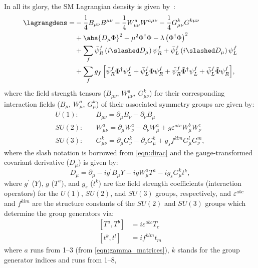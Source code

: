 In all its glory, the SM Lagrangian density is given by~\cite{Halzen:1984mc, thesis_xunwu}:
\begin{align*}
    \lagrangdens =
    & - \frac{1}{4} B_{\mu \nu} B^{\mu \nu} - \frac{1}{4} W^a_{\mu \nu} W^{a \mu \nu} - \frac{1}{4} G^k_{\mu \nu} G^{k \mu \nu}
    \\
    & + \abs{D_\mu\Phi}^2 + \mu^2 \Phi^\dagger \Phi - \lambda \left( \Phi^\dagger \Phi \right)^2
    \\
    & + \sum_f{
            \bar{\psi}^f_R \left(i {\slashed D_\mu}\right) \psi_R^f + \bar{\psi}^f_L \left(i {\slashed D_\mu}\right) \psi_L^f
        }
    \\
    & + \sum_f{
            g_f \left[ \bar{\psi}_R^f \Phi^\dagger \psi_L^f + \bar{\psi}_L^f \Phi \psi_R^f + \bar{\psi}_R^f \tilde{\Phi}^\dagger \psi_L^f + \bar{\psi}_L^f \tilde{\Phi} \psi_R^f \right]
        },
\end{align*}
where the field strength tensors ($B_{\mu \nu}$, $W_{\mu \nu}^a$, $G_{\mu \nu}^k$) for their corresponding interaction fields
($B_\mu$, $W_\mu^a$, $G_\mu^k$)
of their associated symmetry groups are given by:
\begin{align*}
    U(1) : \quad & B_{\mu \nu}    = \partial_\mu B_\nu - \partial_\nu B_\mu
    \\
    SU(2) : \quad & W_{\mu \nu}^a  = \partial_\mu W_\nu^a - \partial_\nu W_\mu^a + g \varepsilon^{abc} W_\mu^b W_\nu^c
    \\
    SU(3) : \quad & G_{\mu \nu}^k  = \partial_\mu G_\nu^k - \partial_\nu G_\mu^k + g_s f^{klm} G_\mu^l G_\nu^m,
\end{align*}
where the slash notation is borrowed from \cref{eqn:dirac} and the gauge-transformed covariant derivative ($D_\mu$) is given by:
\begin{equation*}
    D_\mu = \partial_\mu - i g^\prime B_\mu Y - i g W_\mu^a T^a - i g_s G_\mu^k t^k,
\end{equation*}
where $g^\prime$ ($Y$), $g$ ($T^a$), and $g_s$ ($t^k$) are the field strength coefficients (interaction operators) for the $U(1)$, $SU(2)$, and $SU(3)$ groups, respectively,
and $\varepsilon^{abc}$ and $f^{klm}$ are the structure constants of the $SU(2)$ and $SU(3)$ groups which determine the group generators via:
\begin{align*}
     \left[ T^a, T^b \right] &= i \varepsilon^{abc} T_c
     \\
     \left[ t^k, t^l \right] &= i f^{klm} t_m
\end{align*}
where $a$ runs from 1--3 (from \cref{eqn:gamma_matrices}),
$k$ stands for the group generator indices and runs from 1--8,




